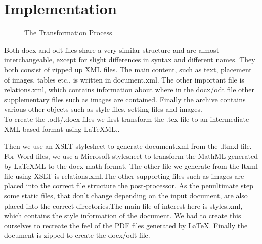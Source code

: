 \documentclass{llncs}
\def\latexml{{\LaTeX}ML\xspace}
\begin{document}
\section{Implementation}\label{sec:impl}

\begin{figure}[ht]\centering
{}
\caption{The Transformation Process}\label{fig:arch}
\end{figure}

Both docx and odt files share a very similar structure and are almost interchangeable,
except for slight differences in syntax and different names. They both consist of zipped up XML files. The main content, such as text, placement of images, tables etc., is written in document.xml. The other important file is relations.xml, which contains information about where in the docx/odt file other supplementary files such as images are contained. Finally the archive contains various other objects such as style files, setting files and images. \\



To create the .odt/.docx files we first transform the .tex file to an intermediate
XML-based format using \latexml..

Then we use an XSLT stylesheet to generate document.xml from the .ltmxl file. For Word files, we use a Microsoft stylesheet to transform the MathML generated by {\LaTeX}ML to the docx math format. The other file we generate from the ltxml file using XSLT is relations.xml.The other supporting files such as images are placed into the correct file structure the post-processor. As the penultimate step some static files, that don't change depending on the input document, are also placed into the correct directories.The main file of interest here is styles.xml, which contains the style information of the document. We had to create this ourselves to recreate the feel of the PDF files generated by {\LaTeX}. Finally the document is zipped to create the docx/odt file. \\ 
\end{document}
